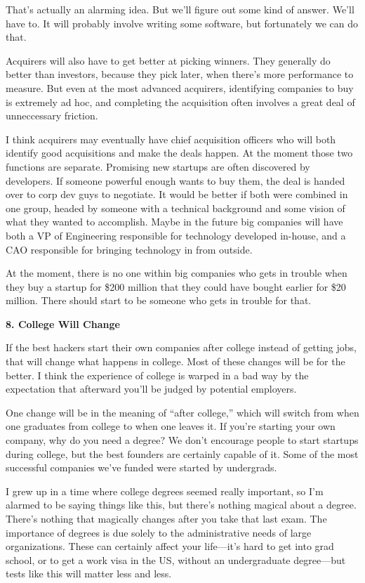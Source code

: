 \documentclass[12pt]{book}
\begin{document}
That's actually an alarming idea. But we'll figure out some kind of
answer. We'll have to. It will probably involve writing some software,
but fortunately we can do that.

Acquirers will also have to get better at picking winners. They
generally do better than investors, because they pick later, when
there's more performance to measure. But even at the most advanced
acquirers, identifying companies to buy is extremely ad hoc, and
completing the acquisition often involves a great deal of unneccessary
friction.

I think acquirers may eventually have chief acquisition officers who
will both identify good acquisitions and make the deals happen. At the
moment those two functions are separate. Promising new startups are
often discovered by developers. If someone powerful enough wants to buy
them, the deal is handed over to corp dev guys to negotiate. It would be
better if both were combined in one group, headed by someone with a
technical background and some vision of what they wanted to accomplish.
Maybe in the future big companies will have both a VP of Engineering
responsible for technology developed in-house, and a CAO responsible for
bringing technology in from outside.

At the moment, there is no one within big companies who gets in trouble
when they buy a startup for \$200 million that they could have bought
earlier for \$20 million. There should start to be someone who gets in
trouble for that.

\textbf{8. College Will Change}

If the best hackers start their own companies after college instead of
getting jobs, that will change what happens in college. Most of these
changes will be for the better. I think the experience of college is
warped in a bad way by the expectation that afterward you'll be judged
by potential employers.

One change will be in the meaning of ``after college,'' which will
switch from when one graduates from college to when one leaves it. If
you're starting your own company, why do you need a degree? We don't
encourage people to start startups during college, but the best founders
are certainly capable of it. Some of the most successful companies we've
funded were started by undergrads.

I grew up in a time where college degrees seemed really important, so
I'm alarmed to be saying things like this, but there's nothing magical
about a degree. There's nothing that magically changes after you take
that last exam. The importance of degrees is due solely to the
administrative needs of large organizations. These can certainly affect
your life---it's hard to get into grad school, or to get a work visa in
the US, without an undergraduate degree---but tests like this will
matter less and less.
\end{document}
